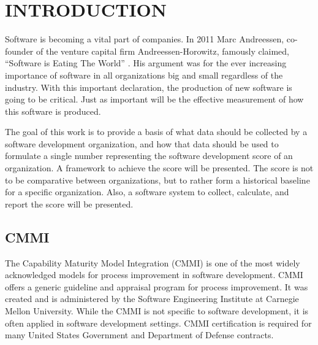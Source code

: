 \documentclass[SDSUThesis.tex]{subfiles}
\begin{document}
\newpage
{}
\setcounter{tocdepth}{2}

\section{INTRODUCTION}

    Software is becoming a vital part of companies. In 2011 Marc Andreessen, 
    co-founder of the venture capital firm Andreessen-Horowitz,
    famously claimed, ``Software is Eating The World'' \cite{Andreessen2001}. 
    His argument was for the ever increasing importance of software
    in all organizations big and small regardless of the industry.  With 
    this important declaration, the production of new software is
    going to be critical.  Just as important will be the effective 
    measurement of how this software is produced.  
    
    The goal of this work is to provide a basis of what data should 
    be collected by a software development organization, and how that data
    should be used to formulate a single number representing the 
    software development score of an organization. A framework to 
    achieve the score will be presented.  The  score
    is not to be comparative between organizations, but to 
    rather form a historical baseline for a specific organization.  Also, a software
    system to collect, calculate, and report the score will be presented.






\subsection{CMMI}
    The Capability Maturity Model Integration (CMMI) is one of the most 
    widely acknowledged models for process 
    improvement in software development.  CMMI offers a generic guideline 
    and appraisal program for process 
    improvement.  It was created and is administered by the 
    Software Engineering Institute at
    Carnegie Mellon University. While the CMMI is not specific to software development,
    it is often applied in software development settings.
    CMMI certification is required for many United States Government 
    and Department of Defense contracts. 
    
\end{document}
